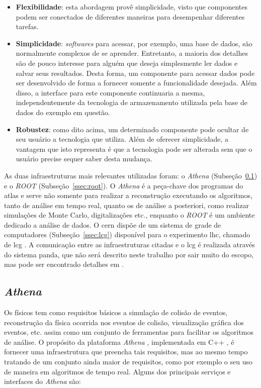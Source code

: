 \begin{itemize}
\item \textbf{Flexibilidade}: esta abordagem provê simplicidade, visto que componentes podem
ser conectados de diferentes maneiras para desempenhar diferentes tarefas.
\item \textbf{Simplicidade}: \emph{softwares} para acessar, por exemplo, uma base de dados, são
normalmente complexos de se aprender. Entretanto, a maioria dos detalhes são de
pouco interesse para alguém que deseja simplesmente ler dados e salvar seus
resultados. Desta forma, um componente para acessar dados pode ser desenvolvido
de forma a fornecer somente a funcionalidade desejada. Além disso, a interface
para este componente continuaria a mesma, independentemente da tecnologia de
armazenamento utilizada pela base de dados do exemplo em questão.
\item \textbf{Robustez}: como dito acima, um determinado componente pode ocultar de seu
usuário a tecnologia que utiliza. Além de oferecer simplicidade, a vantagem que
isto representa é que a tecnologia pode ser alterada sem que o usuário precise
sequer saber desta mudança.
\end{itemize}

As duas infraestruturas mais relevantes utilizadas foram: o \emph{Athena}
(Subseção~\ref{ssec:athena}) e o \emph{ROOT} (Subseção~\ref{ssec:root}). 
O \emph{Athena} é a peça-chave dos programas do \gls{atlas} e serve não somente
para realizar a reconstrução executando os algoritmos, tanto de análise em tempo
real, quanto os de análise a posteriori, como realizar simulações de Monte Carlo, digitalizações etc., 
enquanto o \emph{ROOT} é um ambiente dedicado a análise de dados. 
O \gls{cern} dispõe de um sistema de grade de 
computadores (Subseção~\ref{ssec:lcg}) disponível para o experimento \gls{lhc}, chamado de \gls{lcg} 
\cite{grid}. A comunicação entre as infraestruturas citadas e o \gls{lcg} é realizada através do sistema
\gls{panda}, que não será descrito neste trabalho por sair muito do escopo, 
mas pode ser encontrado detalhes em \cite{panda}.

\subsection{\emph{Athena}}
\label{ssec:athena}


Os físicos tem como requisitos básicos a simulação de colisão de
eventos, reconstrução da física ocorrida nos eventos de colisão, visualização
gráfica dos eventos, etc. assim como um conjunto de ferramentas para facilitar
os algoritmos de análise. O propósito da plataforma \emph{Athena}
\cite{atlascwb,atlaswb}, implementada em C++ \cite{CPP_COMPLETE}, 
é fornecer uma infraestrutura que preencha tais requisitos, 
mas ao mesmo tempo tratando de um conjunto ainda maior de 
requisitos, como por exemplo o seu uso de maneira em algoritmos de tempo real. 
Alguns dos principais serviços e interfaces do \emph{Athena} são:

